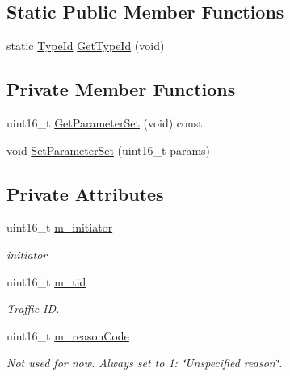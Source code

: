 \subsection*{Static Public Member Functions}
\begin{DoxyCompactItemize}
\item 
static \hyperlink{classns3_1_1TypeId}{Type\+Id} \hyperlink{classns3_1_1MgtDelBaHeader_a96a23ad3a7267c5630719552a139cb10}{Get\+Type\+Id} (void)
\end{DoxyCompactItemize}
\subsection*{Private Member Functions}
\begin{DoxyCompactItemize}
\item 
uint16\+\_\+t \hyperlink{classns3_1_1MgtDelBaHeader_a18d41816833903819948b63489fafff1}{Get\+Parameter\+Set} (void) const 
\item 
void \hyperlink{classns3_1_1MgtDelBaHeader_a6dfc58eded28a549ec428363da3b600c}{Set\+Parameter\+Set} (uint16\+\_\+t params)
\end{DoxyCompactItemize}
\subsection*{Private Attributes}
\begin{DoxyCompactItemize}
\item 
uint16\+\_\+t \hyperlink{classns3_1_1MgtDelBaHeader_a52b4716cc8fc56c28cca6c84acc035b3}{m\+\_\+initiator}
\begin{DoxyCompactList}\small\item\em initiator \end{DoxyCompactList}\item 
uint16\+\_\+t \hyperlink{classns3_1_1MgtDelBaHeader_af1275ea992066afa3ac4e56263604801}{m\+\_\+tid}
\begin{DoxyCompactList}\small\item\em Traffic ID. \end{DoxyCompactList}\item 
uint16\+\_\+t \hyperlink{classns3_1_1MgtDelBaHeader_aa2cf808419b9cc867bc97943b96e8db9}{m\+\_\+reason\+Code}
\begin{DoxyCompactList}\small\item\em Not used for now. Always set to 1\+: \char`\"{}\+Unspecified reason\char`\"{}. \end{DoxyCompactList}\end{DoxyCompactItemize}

